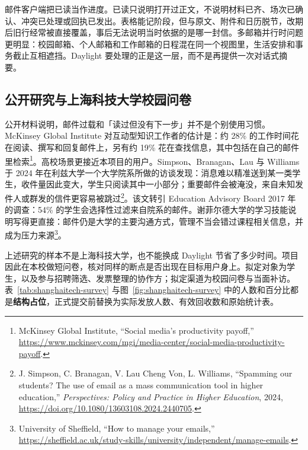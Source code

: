 \documentclass[UTF8,a4paper,zihao=5,fontset=fandol]{ctexart}
\begin{document}
邮件客户端把已读当作进度。已读只说明打开过正文，不说明材料已齐、场次已确认、冲突已处理或回执已发出。表格能记阶段，但与原文、附件和日历脱节，改期后旧行经常被直接覆盖，事后无法说明当时依据的是哪一封信。多邮箱并行时问题更明显：校园邮箱、个人邮箱和工作邮箱的日程混在同一个视图里，生活安排和事务截止互相遮挡。Daylight 要处理的正是这一层，而不是再提供一次对话式摘要。


\subsection{公开研究与上海科技大学校园问卷}
公开材料说明，邮件过载和「读过但没有下一步」并不是个别使用习惯。McKinsey Global Institute 对互动型知识工作者的估计是：约 28\% 的工作时间花在阅读、撰写和回复邮件上，另有约 19\% 花在查找信息，其中包括在自己的邮件里检索\footnote{McKinsey Global Institute, ``Social media's productivity payoff,'' \url{https://www.mckinsey.com/mgi/media-center/social-media-productivity-payoff}.}。高校场景更接近本项目的用户。Simpson、Branagan、Lau 与 Williams 于 2024 年在利兹大学一个大学院系所做的访谈发现：消息难以精准送到某一类学生，收件量因此变大，学生只阅读其中一小部分；重要邮件会被淹没，来自未知发件人或群发的信件更容易被跳过\footnote{J. Simpson, C. Branagan, V. Lau Cheng Von, L. Williams, ``Spamming our students? The use of email as a mass communication tool in higher education,'' \textit{Perspectives: Policy and Practice in Higher Education}, 2024, \url{https://doi.org/10.1080/13603108.2024.2440705}.}。该文转引 Education Advisory Board 2017 年的调查：54\% 的学生会选择性过滤来自院系的邮件。谢菲尔德大学的学习技能说明写得更直接：邮件仍是大学的主要沟通方式，管理不当会错过课程相关信息，并成为压力来源\footnote{University of Sheffield, ``How to manage your emails,'' \url{https://sheffield.ac.uk/study-skills/university/independent/manage-emails}.}。

上述研究的样本不是上海科技大学，也不能换成 Daylight 节省了多少时间。项目因此在本校做短问卷，核对同样的断点是否出现在目标用户身上。拟定对象为学生，以及参与招聘筛选、发票整理的协作方；拟定渠道为校园问卷与当面补访。表~\ref{tab:shanghaitech-survey} 与图~\ref{fig:shanghaitech-survey} 中的人数和百分比都是\textbf{结构占位}，正式提交前替换为实际发放人数、有效回收数和原始统计表。
\end{document}
